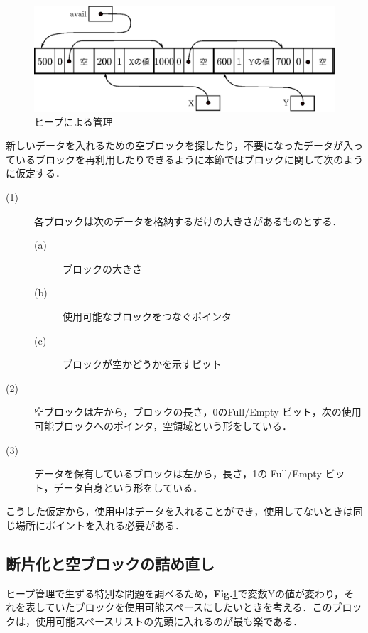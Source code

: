 \documentclass[twocolumn,10pt]{jarticle}
\begin{document}
%
\begin{figure}[H]
\centering
  \includegraphics[scale=0.4]{../figures/eps/fig11.eps}
\caption{ヒープによる管理}
\label{fig11}
\end{figure}
%
新しいデータを入れるための空ブロックを探したり，不要になったデータが入っているブロックを再利用したりできるように本節ではブロックに関して次のように仮定する．
%
\begin{description}
  \item[(1)] 各ブロックは次のデータを格納するだけの大きさがあるものとする．
 \begin{description}
  \item[(a)] ブロックの大きさ
  \item[(b)] 使用可能なブロックをつなぐポインタ
  \item[(c)] ブロックが空かどうかを示すビット
 \end{description}
  \item[(2)] 空ブロックは左から，ブロックの長さ，0のFull/Empty ビット，次の使用可能ブロックへのポインタ，空領域という形をしている．
  \item[(3)] データを保有しているブロックは左から，長さ，1の Full/Empty ビット，データ自身という形をしている．
\end{description}
%
こうした仮定から，使用中はデータを入れることができ，使用してないときは同じ場所にポイントを入れる必要がある．


\subsection{断片化と空ブロックの詰め直し}
%
ヒープ管理で生ずる特別な問題を調べるため，{\bf Fig.}{\ref{fig11}}で変数Yの値が変わり，それを表していたブロックを使用可能スペースにしたいときを考える．このブロックは，使用可能スペースリストの先頭に入れるのが最も楽である．
\end{document}
